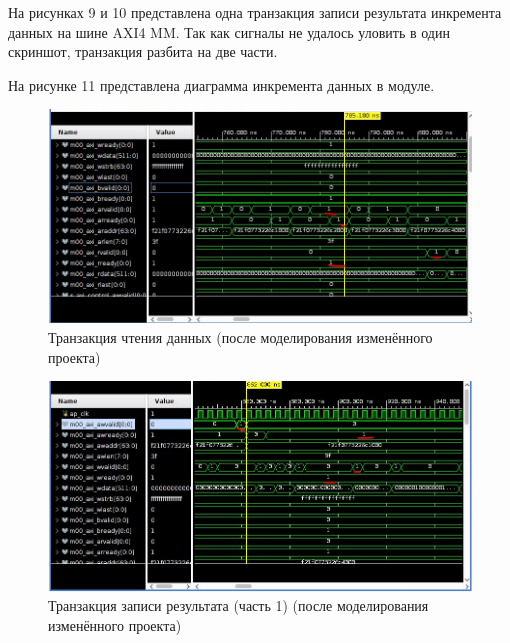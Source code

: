 На рисунках 9 и 10 представлена одна транзакция записи результата инкремента данных на шине AXI4 MM. Так как сигналы не удалось уловить в один скриншот, транзакция разбита на две части.

На рисунке 11 представлена диаграмма инкремента данных в модуле.

\FloatBarrier
\begin{figure}[h]
	\begin{center}
		\includegraphics[width=\linewidth]{inc/read_my.png}
	\end{center}
	\caption{Транзакция чтения данных (после моделирования изменённого проекта)}
\end{figure}
\FloatBarrier

\FloatBarrier
\begin{figure}[h]
	\begin{center}
		\includegraphics[width=\linewidth]{inc/write_my_1.png}
	\end{center}
	\caption{Транзакция записи результата (часть 1) (после моделирования изменённого проекта)}
\end{figure}
\FloatBarrier

